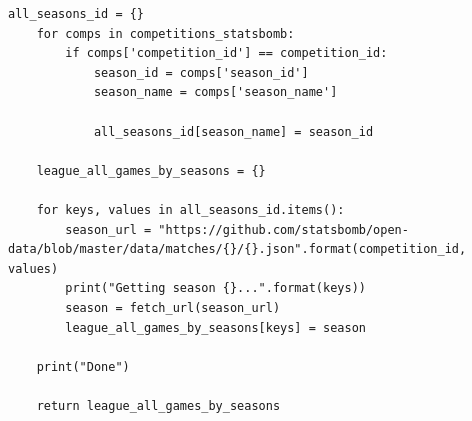 \begin{lstlisting}[style=Python]
    all_seasons_id = {}
    for comps in competitions_statsbomb:
        if comps['competition_id'] == competition_id:
            season_id = comps['season_id']
            season_name = comps['season_name']
        
            all_seasons_id[season_name] = season_id
    
    league_all_games_by_seasons = {}
    
    for keys, values in all_seasons_id.items():
        season_url = "https://github.com/statsbomb/open-data/blob/master/data/matches/{}/{}.json".format(competition_id, values)
        print("Getting season {}...".format(keys))
        season = fetch_url(season_url)
        league_all_games_by_seasons[keys] = season
    
    print("Done")
    
    return league_all_games_by_seasons
\end{lstlisting}
